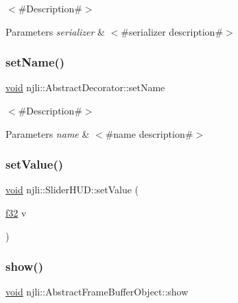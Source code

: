 $<$\#\+Description\#$>$


\begin{DoxyParams}{Parameters}
{\em serializer} & $<$\#serializer description\#$>$ \\
\hline
\end{DoxyParams}
\mbox{\label{classnjli_1_1_slider_h_u_d_a087eb5f8d9f51cc476f12f1d10a3cb95}} 
\subsubsection{\texorpdfstring{set\+Name()}{setName()}}
{\footnotesize\ttfamily \mbox{\hyperlink{_thread_8h_af1e856da2e658414cb2456cb6f7ebc66}{void}} njli\+::\+Abstract\+Decorator\+::set\+Name}

$<$\#\+Description\#$>$


\begin{DoxyParams}{Parameters}
{\em name} & $<$\#name description\#$>$ \\
\hline
\end{DoxyParams}
\mbox{\label{classnjli_1_1_slider_h_u_d_af297ea719c95c5c078620135d8b715c5}} 
\subsubsection{\texorpdfstring{set\+Value()}{setValue()}}
{\footnotesize\ttfamily \mbox{\hyperlink{_thread_8h_af1e856da2e658414cb2456cb6f7ebc66}{void}} njli\+::\+Slider\+H\+U\+D\+::set\+Value (\begin{DoxyParamCaption}\item[{\mbox{\hyperlink{_util_8h_a5f6906312a689f27d70e9d086649d3fd}{f32}}}]{v }\end{DoxyParamCaption})}

\mbox{\label{classnjli_1_1_slider_h_u_d_a73ffd499fceaacd59b518a541ed2133e}} 
\subsubsection{\texorpdfstring{show()}{show()}}
{\footnotesize\ttfamily \mbox{\hyperlink{_thread_8h_af1e856da2e658414cb2456cb6f7ebc66}{void}} njli\+::\+Abstract\+Frame\+Buffer\+Object\+::show}

